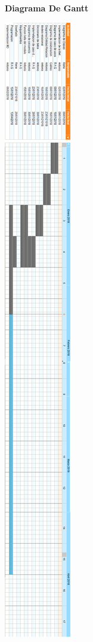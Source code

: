 \documentclass[10pt,a4paper]{report}
\begin{document}
\begin{titlepage}
{\Large\bfseries \center  Diagrama De Gantt \par}
 \vspace{.5cm}
 \center
\includegraphics[scale=.15]{gantt.png} 
\end{titlepage}
\end{document}
